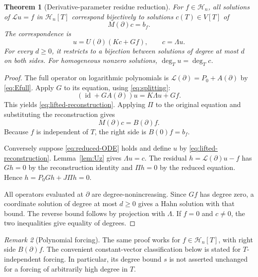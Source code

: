 \documentclass[11pt,a4paper]{article}
\numberwithin{equation}{section}
\newtheorem{theorem}{Theorem}[section]
\theoremstyle{definition}
\theoremstyle{remark}
\newtheorem{remark}[theorem]{Remark}
\theoremstyle{definition}
\newcommand{\Hh}{\mathcal H}
\newcommand{\Ll}{\mathcal L}
\newcommand{\Id}{\operatorname{id}}
\begin{document}
\begin{theorem}[Derivative-parameter residue reduction]
\label{thm:reduction}
For $f\in\Hh_n$, all solutions of $\Ll u=f$ in $\Hh_n[T]$ correspond bijectively to solutions $c(T)\in V[T]$ of
\begin{equation}
 M(\partial)c=b_f.
 \label{eq:reduced-ODE}
\end{equation}
The correspondence is
\begin{equation}
 u=U(\partial)(Kc+Gf),\qquad c=\Lambda u.
 \label{eq:lifted-reconstruction}
\end{equation}
For every $d\ge0$, it restricts to a bijection between solutions of degree at most $d$ on both sides. For homogeneous nonzero solutions, $\deg_Tu=\deg_Tc$.
\end{theorem}
\begin{proof}
The full operator on logarithmic polynomials is $\Ll(\partial)=P_0+A(\partial)$ by \eqref{eq:Efull}. Apply $G$ to its equation, using \eqref{eq:splitting}:
\[
 (\Id+GA(\partial))u=K\Lambda u+Gf.
\]
This yields \eqref{eq:lifted-reconstruction}. Applying $\Pi$ to the original equation and substituting the reconstruction gives
\[
 M(\partial)c=B(\partial)f.
\]
Because $f$ is independent of $T$, the right side is $B(0)f=b_f$.

Conversely suppose \eqref{eq:reduced-ODE} holds and define $u$ by \eqref{eq:lifted-reconstruction}. Lemma~\ref{lem:Uz} gives $\Lambda u=c$. The residual $h=\Ll(\partial)u-f$ has $Gh=0$ by the reconstruction identity and $\Pi h=0$ by the reduced equation. Hence $h=P_0Gh+J\Pi h=0$.

All operators evaluated at $\partial$ are degree-nonincreasing. Since $Gf$ has degree zero, a coordinate solution of degree at most $d\ge0$ gives a Hahn solution with that bound. The reverse bound follows by projection with $\Lambda$. If $f=0$ and $c\ne0$, the two inequalities give equality of degrees.
\end{proof}

\begin{remark}[Polynomial forcing]
The same proof works for $f\in\Hh_n[T]$, with right side $B(\partial)f$. The convenient constant-vector classification below is stated for $T$-independent forcing. In particular, its degree bound $s$ is not asserted unchanged for a forcing of arbitrarily high degree in $T$.
\end{remark}
\end{document}
